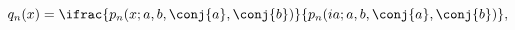 \[q_{n}(x)=\ifrac{\mathop{p_{n}\/}\nolimits\!\left(x;a,b,\conj{a},\conj{b}\right%
)}{\mathop{p_{n}\/}\nolimits\!\left(ia;a,b,\conj{a},\conj{b}\right)},\]